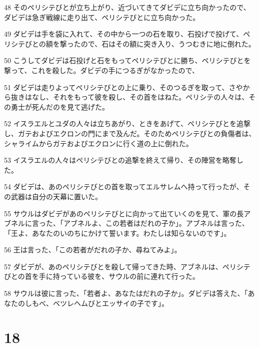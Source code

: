 \par 48 そのペリシテびとが立ち上がり、近づいてきてダビデに立ち向かったので、ダビデは急ぎ戦線に走り出て、ペリシテびとに立ち向かった。
\par 49 ダビデは手を袋に入れて、その中から一つの石を取り、石投げで投げて、ペリシテびとの額を撃ったので、石はその額に突き入り、うつむきに地に倒れた。
\par 50 こうしてダビデは石投げと石をもってペリシテびとに勝ち、ペリシテびとを撃って、これを殺した。ダビデの手につるぎがなかったので、
\par 51 ダビデは走りよってペリシテびとの上に乗り、そのつるぎを取って、さやから抜きはなし、それをもって彼を殺し、その首をはねた。ペリシテの人々は、その勇士が死んだのを見て逃げた。
\par 52 イスラエルとユダの人々は立ちあがり、ときをあげて、ペリシテびとを追撃し、ガテおよびエクロンの門にまで及んだ。そのためペリシテびとの負傷者は、シャライムからガテおよびエクロンに行く道の上に倒れた。
\par 53 イスラエルの人々はペリシテびとの追撃を終えて帰り、その陣営を略奪した。
\par 54 ダビデは、あのペリシテびとの首を取ってエルサレムへ持って行ったが、その武器は自分の天幕に置いた。
\par 55 サウルはダビデがあのペリシテびとに向かって出ていくのを見て、軍の長アブネルに言った、「アブネルよ、この若者はだれの子か」。アブネルは言った、「王よ、あなたのいのちにかけて誓います。わたしは知らないのです」。
\par 56 王は言った、「この若者がだれの子か、尋ねてみよ」。
\par 57 ダビデが、あのペリシテびとを殺して帰ってきた時、アブネルは、ペリシテびとの首を手に持っている彼を、サウルの前に連れて行った。
\par 58 サウルは彼に言った、「若者よ、あなたはだれの子か」。ダビデは答えた、「あなたのしもべ、ベツレヘムびとエッサイの子です」。

\chapter{18}

